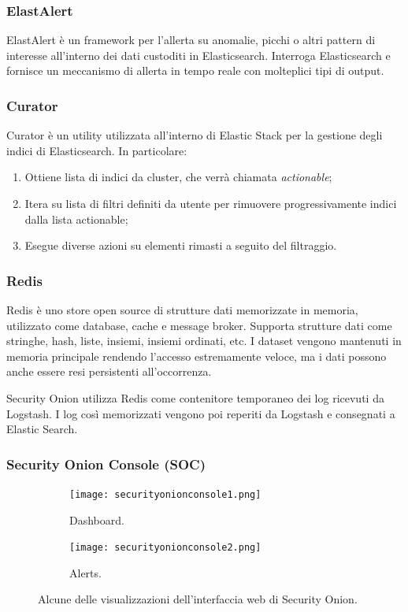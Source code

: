 \subsubsection*{ElastAlert}
ElastAlert \cite{elastalert} è un framework per l'allerta su anomalie, picchi  o altri pattern di interesse all'interno dei dati custoditi in Elasticsearch. Interroga Elasticsearch e fornisce un meccanismo di allerta in tempo reale con molteplici tipi di output. 

\subsubsection*{Curator}
Curator \cite{curator} è un utility utilizzata all'interno di Elastic Stack per la gestione degli indici di Elasticsearch. In particolare: 
\begin{enumerate}
    \item Ottiene lista di indici da cluster, che verrà chiamata \textit{actionable};
    \item Itera su lista di filtri definiti da utente per rimuovere progressivamente indici dalla lista actionable;
    \item Esegue diverse azioni su elementi rimasti a seguito del filtraggio.
\end{enumerate}

\subsubsection*{Redis}
Redis \cite{redis} è uno store open source di strutture dati memorizzate in memoria, utilizzato come database, cache e message broker. Supporta strutture dati come stringhe, hash, liste, insiemi, insiemi ordinati, etc.
I  dataset vengono mantenuti in memoria principale rendendo l'accesso estremamente veloce, ma i dati possono anche essere resi persistenti all'occorrenza.

Security Onion utilizza Redis come contenitore temporaneo dei log ricevuti da Logstash. I log così memorizzati vengono poi reperiti da Logstash e consegnati a Elastic Search.

\subsubsection*{Security Onion Console (SOC)}


\begin{figure}[hbtp]
    \centering
    \begin{subfigure}{0.45\textwidth}
        \centering
        \texttt{[image: securityonionconsole1.png]}
        \caption{Dashboard.}
        \label{fig:securityonionconsole1}
    \end{subfigure}
    \begin{subfigure}{0.45\textwidth}
        \centering
        \texttt{[image: securityonionconsole2.png]}
        \caption{Alerts.}
        \label{fig:securityonionconsole2}
    \end{subfigure}
    \caption{Alcune delle visualizzazioni dell'interfaccia web di Security Onion.}
    \label{fig:securityonionconsoles}
\end{figure}

